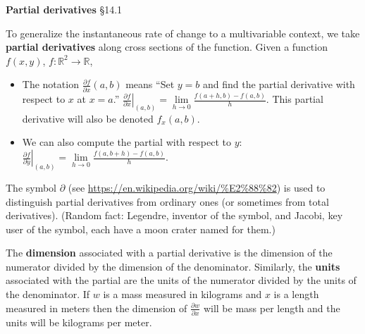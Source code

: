 \documentclass[12pt,letterpaper,noanswers]{exam}
\begin{document}
\noindent\textbf{Partial derivatives} \S 14.1
\begin{tcolorbox}
To generalize the instantaneous rate of change to a multivariable context, we take \textbf{partial derivatives} along cross sections of the function.  Given a function $f(x,y)$, $f:\mathbb{R}^2 \rightarrow \mathbb{R}$,
\begin{itemize}
\item The notation $\frac{\partial f}{\partial x}(a,b)$ means ``Set $y=b$ and find the partial derivative with respect to $x$ at $x=a$.''  $\left.\frac{\partial f}{\partial x}\right\vert_{(a,b)} =  \lim\limits_{h\rightarrow 0} \frac{f(a+h,b) - f(a,b)}{h}.$  This partial derivative will also be denoted $f_x(a,b)$.
\item We can also compute the partial with respect to $y$: $\left.\frac{\partial f}{\partial y}\right\vert_{(a,b)} =  \lim\limits_{h\rightarrow 0} \frac{f(a,b+h) - f(a,b)}{h}.$ 
\end{itemize}

The symbol $\partial$ (see \url{https://en.wikipedia.org/wiki/%E2%88%82}) is used to distinguish partial derivatives from ordinary ones (or sometimes from total derivatives).  (Random fact: Legendre, inventor of the symbol, and Jacobi, key user of the symbol, each have a moon crater named for them.)

The \textbf{dimension} associated with a partial derivative is the dimension of the numerator divided by the dimension of the denominator.  Similarly, the \textbf{units} associated with the partial are the units of the numerator divided by the units of the denominator. If $w$ is a mass measured in kilograms and $x$ is a length measured in meters then the dimension of $\frac{\partial w}{\partial x}$ will be mass per length and the units will be kilograms per meter.


\end{tcolorbox}
\end{document}

